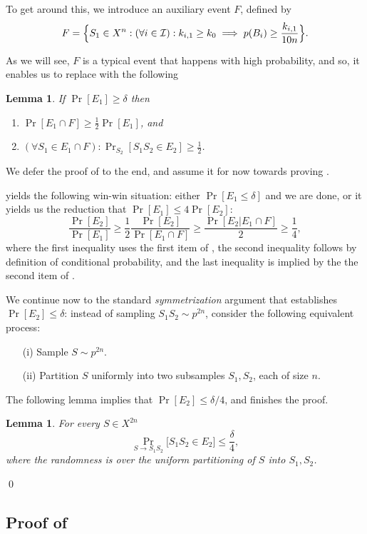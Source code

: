 \documentclass{article}
\newtheorem{lemma}[theorem]{Lemma}
\newcommand{\I}{\mathcal{I}}
\begin{document}
To get around this, we introduce an auxiliary event $F$, defined by
\[F = \Bigl\{S_1\in X^{n} : (\forall i\in\I): k_{i,1} \geq k_0 \implies p(B_i)\geq \frac{k_{i,1}}{10n}\Bigr\}. \]

As we will see, $F$ is a typical event that happens with high probability,
and so, it enables us to replace  with the following
\begin{lemma}\label{lem:reduction}
If $\Pr[E_1]\geq \delta$ then 
\begin{enumerate}
\item $\Pr[E_1\cap F] \geq \frac{1}{2}\Pr[E_1]$, and
\item $(\forall S_1\in E_1\cap F): \Pr_{S_2}[S_1S_2\in E_2] \geq \frac{1}{2}$. 
\end{enumerate}
\end{lemma}
We defer the proof of  to the end, 
and assume it for now towards proving .

 yields the following win-win situation:
either $\Pr[E_1 \leq \delta]$ and we are done, or 
it yields us the reduction that $\Pr[E_1]\leq 4\Pr[E_2]$:
\[\frac{\Pr[E_2]}{\Pr[E_1]} \geq  \frac{1}{2}\frac{\Pr[E_2]}{\Pr[E_1\cap F]} \geq \frac{\Pr[E_2 \vert E_1\cap F]}{2} \geq \frac{1}{4},\]
where the first inequality uses the first item of , 
the second inequality follows by definition of conditional probability,
and the last inequality is implied by the the second item of .


We continue now to the standard \emph{symmetrization} argument
that establishes $\Pr[E_2]\leq\delta$:
instead of sampling $S_1S_2\sim p^{2n}$,
consider the following equivalent process:
\begin{itemize}
\item[(i)] Sample $S\sim p^{2n}$.
\item[(ii)] Partition $S$ uniformly into two subsamples $S_1,S_2$, each of size $n$.
\end{itemize}
The following lemma implies that $\Pr[E_2]\leq \delta/4$, and finishes the proof.
\begin{lemma}\label{lem:e2}
For every $S\in X^{2n}$
\[\Pr_{S\to S_1S_2}\bigl[S_1S_2\in E_2\bigr]\leq \frac{\delta}{4},\]
where the randomness is over the uniform partitioning
of $S$ into $S_1,S_2$.
\end{lemma}
\qed

\subsection{Proof of }
\end{document}
